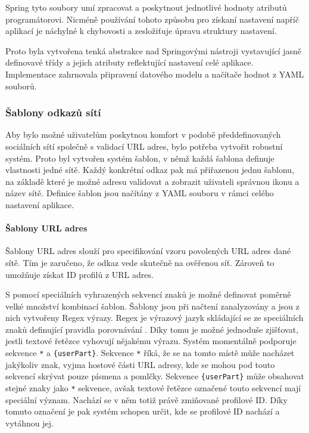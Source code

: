 		Spring tyto soubory umí zpracovat a poskytnout jednotlivé hodnoty atributů programátorovi.
		Nicméně používání tohoto způsobu pro získaní nastavení napříč aplikací je náchylné k chybovosti a
		zesložiťuje úpravu struktury nastavení.

		Proto byla vytvořena tenká abstrakce nad Springovými nástroji vystavující jasně definovavé třídy a jejich atributy
		reflektující nastavení celé aplikace.
		Implementace zahrnovala připravení datového modelu a načítače hodnot z \ac{YAML} souborů.


		\subsubsection{Šablony odkazů sítí}

		Aby bylo možné uživatelům poskytnou komfort v podobě předdefinovaných sociálních sítí společně s validací \ac{URL} adres,
		bylo potřeba vytvořit robustní systém.
		Proto byl vytvořen systém šablon, v němž každá šablona definuje vlastnosti jedné sítě.
		Každý konkrétní odkaz pak má přiřazenou jednu šablonu, na základě které je možné adresu validovat a
		zobrazit uživateli správnou ikonu a název sítě.
		Definice šablon jsou načítány z \ac{YAML} souboru v rámci celého nastavení aplikace.

			\paragraph{Šablony URL adres}

			Šablony \ac{URL} adres slouží pro specifikování vzoru povolených \ac{URL} adres dané sítě.
			Tím je zaručeno, že odkaz vede skutečně na ověřenou síť.
			Zároveň to umožňuje získat ID profilů z \ac{URL} adres.

			S pomocí speciálních vyhrazených sekvencí znaků je možné definovat poměrně velké množství kombinací
			šablon.
			Šablony jsou při načtení zanalyzovány a jsou z nich vytvořeny Regex výrazy.
			Regex je výrazový jazyk skládající se ze speciálních znaků definující pravidla porovnávání \cite{regex}.
			Díky tomu je možné jednoduše zjišťovat, jestli textové řetězce vyhovují nějakému výrazu.
			Systém momentálně podporuje sekvence \lstinline{*} a \lstinline!{userPart}!.
			Sekvence \lstinline{*} říká, že se na tomto místě může nacházet jakýkoliv znak, vyjma hostové části \ac{URL}
			adresy, kde se mohou pod touto sekvencí skrývat pouze písmena a pomlčky.
			Sekvence \lstinline!{userPart}! může obsahovat stejné znaky jako \lstinline{*} sekvence, avšak textové
			řetězce označené touto sekvencí mají speciální význam.
			Nachází se v něm totiž právě zmiňované profilové ID.
			Díky tomuto označení je pak systém schopen určit, kde se profilové ID nachází a vytáhnou jej.

